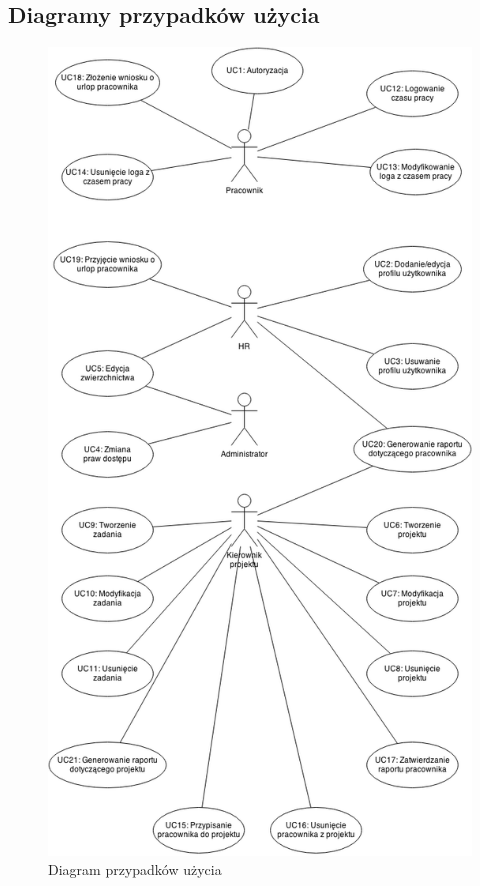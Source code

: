 \subsection{Diagramy przypadków użycia}
\begin{figure}[H]
    \centering
    \includegraphics[scale=0.49]{diagramy/usecases/usecases.png}
    \caption{Diagram przypadków użycia}
    \label{fig:usecase}
\end{figure}
